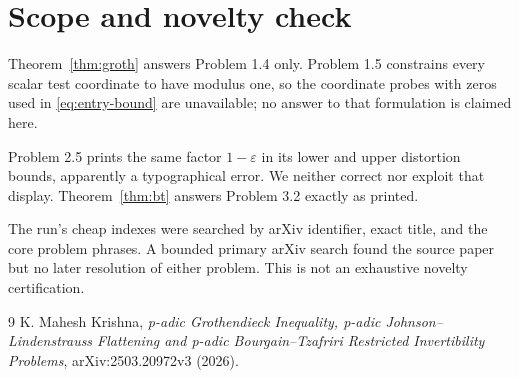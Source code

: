 \documentclass[11pt]{article}
\begin{document}
\section{Scope and novelty check}

Theorem~\ref{thm:groth} answers Problem 1.4 only.  Problem 1.5 constrains
every scalar test coordinate to have modulus one, so the coordinate probes
with zeros used in \eqref{eq:entry-bound} are unavailable; no answer to that
formulation is claimed here.

Problem 2.5 prints the same factor $1-\varepsilon$ in its lower and upper
distortion bounds, apparently a typographical error.  We neither correct nor
exploit that display.  Theorem~\ref{thm:bt} answers Problem 3.2 exactly as
printed.

The run's cheap indexes were searched by arXiv identifier, exact title, and
the core problem phrases.  A bounded primary arXiv search found the source
paper but no later resolution of either problem.  This is not an exhaustive
novelty certification.

\begin{thebibliography}{9}
K. Mahesh Krishna,
\emph{p-adic Grothendieck Inequality, p-adic Johnson--Lindenstrauss
Flattening and p-adic Bourgain--Tzafriri Restricted Invertibility Problems},
arXiv:2503.20972v3 (2026).
\end{thebibliography}
\end{document}
